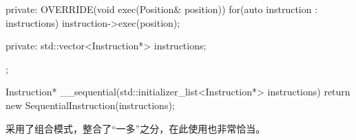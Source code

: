 \begin{content}
\begin{leftbar}
\begin{c++}[caption={src/robot-cleaner/Instruction.cpp}]
{{    private:
        OVERRIDE(void exec(Position& position))
        {
            for(auto instruction : instructions)
            {
                instruction->exec(position);
            }
        }

    private:
        std::vector<Instruction*> instructions;
    };
}

Instruction* __sequential(std::initializer_list<Instruction*> instructions)
{
    return new SequentialInstruction(instructions);
}
\end{c++}
\end{leftbar}

采用了组合模式，整合了“一多”之分，在此使用也非常恰当。

\end{content}
